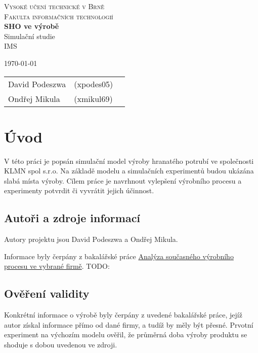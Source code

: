 \documentclass[11pt, a4paper]{article}
\begin{document}
\begin{titlepage}
\begin{center}
\Huge
\textsc{Vysoké učení technické v Brně}\\
\huge
\textsc{Fakulta informačních technologií}\\
\LARGE
{\bf SHO ve výrobě}\\Simulační studie\\IMS
{}
\end{center}
\Large
\today\hfill
\begin{tabular}{l l l}
		David Podeszwa & (xpodes05)\\
		Ondřej Mikula & (xmikul69)\\
\end{tabular}
\end{titlepage}

\newpage
\tableofcontents
\newpage


\section{Úvod}
V této práci je popsán simulační model výroby hranatého potrubí ve společnosti KLMN spol s.r.o. Na základě modelu a simulačních experimentů budou ukázána slabá místa výroby. Cílem práce je  navrhnout vylepšení výrobního procesu a
experimenty potvrdit či vyvrátit jejich účinnost.
\subsection{Autoři a zdroje informací}
Autory projektu jsou David Podeszwa a Ondřej Mikula.


Informace byly čerpány z bakalářské práce \href{http://digilib.k.utb.cz/bitstream/handle/10563/22155/%20ih%C3%A1k_2012_bp.pdf?sequence=1}{Analýza současného výrobního procesu ve
vybrané firmě}. TODO:%
\subsection{Ověření validity}
Konkrétní informace o výrobě byly čerpány z uvedené bakalářské práce, jejíž autor získal informace přímo od dané firmy, a tudíž by měly být přesné. Prvotní experiment na výchozím modelu ověřil, že průměrná doba výroby produktu se shoduje s dobou uvedenou ve zdroji.
\end{document}
